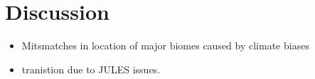 \section{Discussion}

\begin{itemize}
    \item Mitsmatches in location of major biomes caused by climate biases
    \item tranistion due to JULES issues.
\end{itemize}